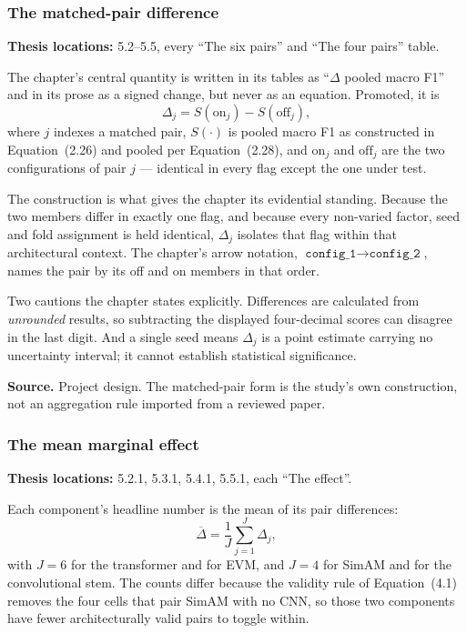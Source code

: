 \documentclass[11pt,a4paper]{article}
\numberwithin{equation}{section}
\begin{document}
\subsubsection{The matched-pair difference}
\label{fg5:pair-difference}
\textbf{Thesis locations:} 5.2--5.5, every ``The six pairs'' and ``The four
pairs'' table.

The chapter's central quantity is written in its tables as
``$\Delta$ pooled macro F1'' and in its prose as a signed change, but never as
an equation. Promoted, it is
\begin{equation}
    \Delta_j = S\!\left(\mathrm{on}_j\right) - S\!\left(\mathrm{off}_j\right),
    \label{fg5:eq:pair-difference}
\end{equation}
where $j$ indexes a matched pair, $S(\cdot)$ is pooled macro F1 as constructed
in Equation~(2.26) and pooled per Equation~(2.28), and
$\mathrm{on}_j$ and $\mathrm{off}_j$ are the two configurations of pair $j$ ---
identical in every flag except the one under test.

The construction is what gives the chapter its evidential standing. Because
the two members differ in exactly one flag, and because every non-varied
factor, seed and fold assignment is held identical, $\Delta_j$ isolates that
flag within that architectural context. The chapter's arrow notation,
$\texttt{config\_1} \rightarrow \texttt{config\_2}$, names the pair by its off
and on members in that order.

Two cautions the chapter states explicitly. Differences are calculated from
\emph{unrounded} results, so subtracting the displayed four-decimal scores can
disagree in the last digit. And a single seed means $\Delta_j$ is a point
estimate carrying no uncertainty interval; it cannot establish statistical
significance.

\textbf{Source.} Project design. The matched-pair form is the study's own
construction, not an aggregation rule imported from a reviewed paper.

\subsubsection{The mean marginal effect}
\label{fg5:mean-effect}
\textbf{Thesis locations:} 5.2.1, 5.3.1, 5.4.1, 5.5.1, each ``The effect''.

Each component's headline number is the mean of its pair differences:
\begin{equation}
    \overline{\Delta} = \frac1J \sum_{j=1}^{J} \Delta_j,
    \label{fg5:eq:mean-effect}
\end{equation}
with $J = 6$ for the transformer and for EVM, and $J = 4$ for SimAM and for
the convolutional stem. The counts differ because the validity rule of
Equation~(4.1) removes the four cells that pair SimAM with no CNN, so those
two components have fewer architecturally valid pairs to toggle within.
\end{document}
